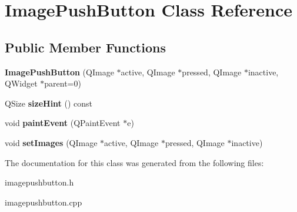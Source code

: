 \hypertarget{class_image_push_button}{
\section{ImagePushButton Class Reference}
\label{class_image_push_button}
}
\subsection*{Public Member Functions}
\begin{DoxyCompactItemize}
\item 
\hypertarget{class_image_push_button_aa902cdf021d9e989c482ac0594aa7440}{
{\bfseries ImagePushButton} (QImage $\ast$active, QImage $\ast$pressed, QImage $\ast$inactive, QWidget $\ast$parent=0)}
\label{class_image_push_button_aa902cdf021d9e989c482ac0594aa7440}

\item 
\hypertarget{class_image_push_button_a8d216ff47dfecb94039aa92a578587ef}{
QSize {\bfseries sizeHint} () const }
\label{class_image_push_button_a8d216ff47dfecb94039aa92a578587ef}

\item 
\hypertarget{class_image_push_button_a98e7d52787bbf4aa58c3a8296438640c}{
void {\bfseries paintEvent} (QPaintEvent $\ast$e)}
\label{class_image_push_button_a98e7d52787bbf4aa58c3a8296438640c}

\item 
\hypertarget{class_image_push_button_a908cd5617b708c3c370bb6c501f7c0f4}{
void {\bfseries setImages} (QImage $\ast$active, QImage $\ast$pressed, QImage $\ast$inactive)}
\label{class_image_push_button_a908cd5617b708c3c370bb6c501f7c0f4}

\end{DoxyCompactItemize}


The documentation for this class was generated from the following files:\begin{DoxyCompactItemize}
\item 
imagepushbutton.h\item 
imagepushbutton.cpp\end{DoxyCompactItemize}
